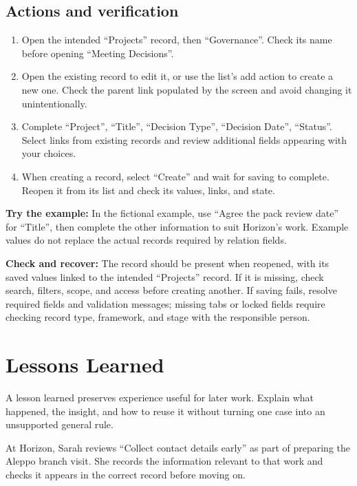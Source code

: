 \subsection{Actions and verification}
\begin{enumerate}
\item Open the intended “Projects” record, then “Governance”. Check its name before opening “Meeting Decisions”.
\item Open the existing record to edit it, or use the list's add action to create a new one. Check the parent link populated by the screen and avoid changing it unintentionally.
\item Complete “Project”, “Title”, “Decision Type”, “Decision Date”, “Status”. Select links from existing records and review additional fields appearing with your choices.
\item When creating a record, select “Create” and wait for saving to complete. Reopen it from its list and check its values, links, and state.
\end{enumerate}

\textbf{Try the example:} In the fictional example, use “Agree the pack review date” for “Title”, then complete the other information to suit Horizon's work. Example values do not replace the actual records required by relation fields.

\textbf{Check and recover:} The record should be present when reopened, with its saved values linked to the intended “Projects” record. If it is missing, check search, filters, scope, and access before creating another. If saving fails, resolve required fields and validation messages; missing tabs or locked fields require checking record type, framework, and stage with the responsible person.

\clearpage
\section{Lessons Learned}
\label{sec:projects-feature-lessons-learned}

A lesson learned preserves experience useful for later work. Explain what happened, the insight, and how to reuse it without turning one case into an unsupported general rule.

\begin{rcnote}
At Horizon, Sarah reviews “Collect contact details early” as part of preparing the Aleppo branch visit. She records the information relevant to that work and checks it appears in the correct record before moving on.
\end{rcnote}


